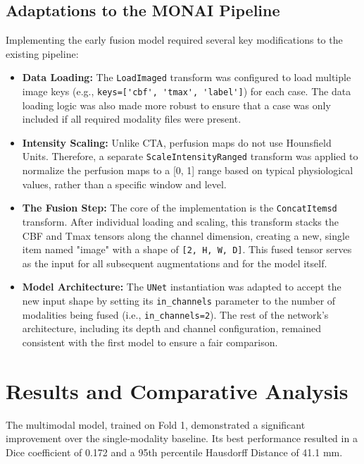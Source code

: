 \subsection{Adaptations to the MONAI Pipeline}
\label{subsec:pipeline_adaptations}
Implementing the early fusion model required several key modifications to the existing pipeline:

\begin{itemize}
    \item \textbf{Data Loading:} The \texttt{LoadImaged} transform was configured to load multiple image keys (e.g., \verb|keys=['cbf', 'tmax', 'label']|) for each case. The data loading logic was also made more robust to ensure that a case was only included if all required modality files were present.
    
    \item \textbf{Intensity Scaling:} Unlike CTA, perfusion maps do not use Hounsfield Units. Therefore, a separate \texttt{ScaleIntensityRanged} transform was applied to normalize the perfusion maps to a [0, 1] range based on typical physiological values, rather than a specific window and level.

    \item \textbf{The Fusion Step:} The core of the implementation is the \texttt{ConcatItemsd} transform. After individual loading and scaling, this transform stacks the CBF and Tmax tensors along the channel dimension, creating a new, single item named "image" with a shape of \verb|[2, H, W, D]|. This fused tensor serves as the input for all subsequent augmentations and for the model itself.

    \item \textbf{Model Architecture:} The \texttt{UNet} instantiation was adapted to accept the new input shape by setting its \verb|in_channels| parameter to the number of modalities being fused (i.e., \verb|in_channels=2|). The rest of the network's architecture, including its depth and channel configuration, remained consistent with the first model to ensure a fair comparison.
\end{itemize}


\section{Results and Comparative Analysis}
\label{sec:results_comparison}
The multimodal model, trained on Fold 1, demonstrated a significant improvement over the single-modality baseline. Its best performance resulted in a Dice coefficient of 0.172 and a 95th percentile Hausdorff Distance of 41.1 mm.

